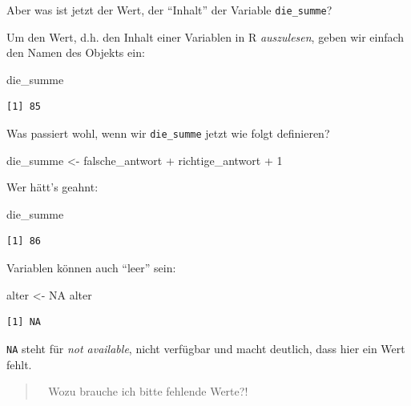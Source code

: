 \documentclass[
  letterpaper,
  DIV=11,
  numbers=noendperiod]{scrartcl}
\newenvironment{Shaded}{\begin{snugshade}}{\end{snugshade}}
\newcommand{\ConstantTok}[1]{\textcolor[rgb]{0.56,0.35,0.01}{#1}}
\newcommand{\DecValTok}[1]{\textcolor[rgb]{0.68,0.00,0.00}{#1}}
\newcommand{\NormalTok}[1]{\textcolor[rgb]{0.00,0.23,0.31}{#1}}
\newcommand{\OtherTok}[1]{\textcolor[rgb]{0.00,0.23,0.31}{#1}}
\newcommand{\SpecialCharTok}[1]{\textcolor[rgb]{0.37,0.37,0.37}{#1}}
\theoremstyle{definition}
\theoremstyle{definition}
\theoremstyle{definition}
\theoremstyle{remark}
\begin{document}
Aber was ist jetzt der Wert, der ``Inhalt'' der Variable
\texttt{die\_summe}?

Um den Wert, d.h. den Inhalt einer Variablen in R \emph{auszulesen},
geben wir einfach den Namen des Objekts ein:

\begin{Shaded}
\begin{Highlighting}[]
\NormalTok{die\_summe}
\end{Highlighting}
\end{Shaded}

\begin{verbatim}
[1] 85
\end{verbatim}

Was passiert wohl, wenn wir \texttt{die\_summe} jetzt wie folgt
definieren?

\begin{Shaded}
\begin{Highlighting}[]
\NormalTok{die\_summe }\OtherTok{\textless{}{-}}\NormalTok{ falsche\_antwort }\SpecialCharTok{+}\NormalTok{ richtige\_antwort }\SpecialCharTok{+} \DecValTok{1}
\end{Highlighting}
\end{Shaded}

Wer hätt's geahnt:

\begin{Shaded}
\begin{Highlighting}[]
\NormalTok{die\_summe}
\end{Highlighting}
\end{Shaded}

\begin{verbatim}
[1] 86
\end{verbatim}

Variablen können auch ``leer'' sein:

\begin{Shaded}
\begin{Highlighting}[]
\NormalTok{alter }\OtherTok{\textless{}{-}} \ConstantTok{NA}
\NormalTok{alter}
\end{Highlighting}
\end{Shaded}

\begin{verbatim}
[1] NA
\end{verbatim}

\texttt{NA} steht für \emph{not available}, nicht verfügbar und macht
deutlich, dass hier ein Wert fehlt.

\begin{quote}
🧑‍🎓 Wozu brauche ich bitte fehlende Werte?!
\end{quote}
\end{document}
